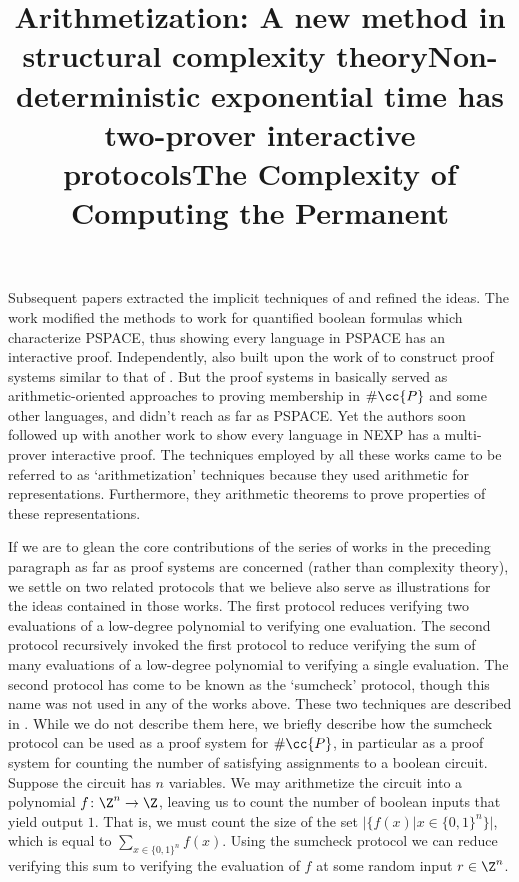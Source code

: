 Subsequent papers extracted the implicit techniques of \cite{FKLN92} and refined the ideas.
The work \cite{Sha92} modified the methods to work for quantified boolean formulas which characterize PSPACE, thus showing every language in PSPACE has an interactive proof.
Independently, \cite{BF91} also built upon the work of \cite{FKLN92} to construct proof systems similar to that of \cite{Sha92}.
But the proof systems in \cite{BF91} basically served as arithmetic-oriented approaches to proving membership in $\#\cc{P}$ and some other languages, and didn't reach as far as PSPACE.
Yet the authors soon followed up with another work \cite{BFL91} to show every language in NEXP has a multi-prover interactive proof.
The techniques employed by all these works came to be referred to as `arithmetization' techniques because they used arithmetic for representations.
Furthermore, they arithmetic theorems to prove properties of these representations.

If we are to glean the core contributions of the series of works in the preceding paragraph as far as proof systems are concerned (rather than complexity theory), we settle on two related protocols that we believe also serve as illustrations for the ideas contained in those works.
The first protocol reduces verifying two evaluations of a low-degree polynomial to verifying one evaluation.
The second protocol recursively invoked the first protocol to reduce verifying the sum of many evaluations of a low-degree polynomial to verifying a single evaluation.
The second protocol has come to be known as the `sumcheck' protocol, though this name was not used in any of the works above.
These two techniques are described in .
While we do not describe them here, we briefly describe how the sumcheck protocol can be used as a proof system for $\#\cc{P}$, in particular as a proof system for counting the number of satisfying assignments to a boolean circuit.
Suppose the circuit has $n$ variables.
We may arithmetize the circuit into a polynomial $f\colon\Z^n\to\Z$, leaving us to count the number of boolean inputs that yield output $1$.
That is, we must count the size of the set $|\{ f(x) | x\in\{0,1\}^n \}|$, which is equal to $\sum_{x\in\{0,1\}^n} f(x)$.
Using the sumcheck protocol we can reduce verifying this sum to verifying the evaluation of $f$ at some random input $r\in\Z^n$.

\begin{references}
    \title{Arithmetization: A new method in structural complexity theory}

    \title{Non-deterministic exponential time has two-prover interactive protocols}

    \title{The Complexity of Computing the Permanent}
\end{references}